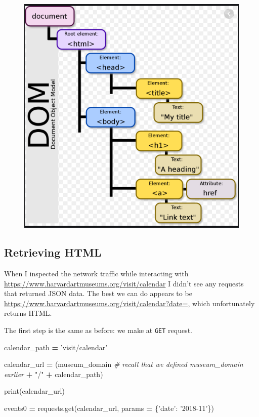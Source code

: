 \documentclass[]{book}
\newenvironment{Shaded}{\begin{snugshade}}{\end{snugshade}}
\newcommand{\StringTok}[1]{\textcolor[rgb]{0.31,0.60,0.02}{#1}}
\newcommand{\CommentTok}[1]{\textcolor[rgb]{0.56,0.35,0.01}{\textit{#1}}}
\newcommand{\OperatorTok}[1]{\textcolor[rgb]{0.81,0.36,0.00}{\textbf{#1}}}
\newcommand{\BuiltInTok}[1]{#1}
\newcommand{\NormalTok}[1]{#1}
\begin{document}
\begin{figure}
\centering
\includegraphics{Python/PythonWebScrape/images/DOM.png}
\caption{}
\end{figure}

\subsection{Retrieving HTML}\label{retrieving-html}

When I inspected the network traffic while interacting with
\url{https://www.harvardartmuseums.org/visit/calendar} I didn't see any
requests that returned JSON data. The best we can do appears to be
\url{https://www.harvardartmuseums.org/visit/calendar?date=}, which
unfortunately returns HTML.

The first step is the same as before: we make at \texttt{GET} request.

\begin{Shaded}
\begin{Highlighting}[]
\NormalTok{calendar_path }\OperatorTok{=} \StringTok{'visit/calendar'}

\NormalTok{calendar_url }\OperatorTok{=}\NormalTok{ (museum_domain }\CommentTok{# recall that we defined museum_domain earlier}
                  \OperatorTok{+} \StringTok{"/"}
                  \OperatorTok{+}\NormalTok{ calendar_path)}

\BuiltInTok{print}\NormalTok{(calendar_url)}

\NormalTok{events0 }\OperatorTok{=}\NormalTok{ requests.get(calendar_url, params }\OperatorTok{=}\NormalTok{ \{}\StringTok{'date'}\NormalTok{: }\StringTok{'2018-11'}\NormalTok{\})}
\end{Highlighting}
\end{Shaded}
\end{document}
